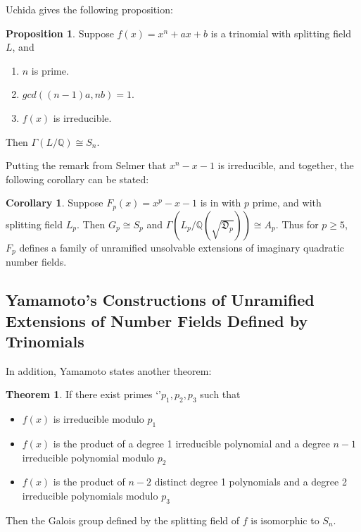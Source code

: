 \documentclass[12pt]{extarticle}
\newcommand{\Q}{\mathbb{Q}}
\newcommand{\<}{\langle}
\renewcommand{\>}{\rangle}
\theoremstyle{definition}
\newtheorem{theorem}{Theorem}
\newtheorem{corollary}{Corollary}
\newtheorem{proposition}{Proposition}
\begin{document}
Uchida \cite{uchida1970} gives the following proposition:
\begin{proposition}
Suppose $f(x)=x^n+ax+b$ is a trinomial with splitting field $L$, and 
\begin{enumerate}
\item $n$ is prime.
\item $gcd((n-1)a,nb)=1$.
\item $f(x)$ is irreducible.
\end{enumerate}
Then $\Gamma(L/\Q) \cong S_n$. \label{prop:uchida}
\end{proposition}
Putting the remark from Selmer \cite{SELMER} that $x^n-x-1$ is irreducible,  and  together, the following corollary can be stated:
\begin{corollary}
Suppose $F_p(x)=x^p-x-1$ is in  with $p$ prime, and with splitting field $L_p$. Then $G_p \cong S_p$ and $\Gamma\left(L_p/\Q\left(\sqrt{\mathfrak{D}_p}\right)\right)\cong A_p$. Thus for $p \geq 5$, $F_p$ defines a family of unramified unsolvable extensions of imaginary quadratic number fields. 
\end{corollary}
\subsection{Yamamoto's Constructions of Unramified Extensions of Number Fields Defined by Trinomials}
In addition, Yamamoto states another theorem:
\begin{theorem}
If there exist primes `'$p_1, p_2, p_3$ such that \begin{itemize}
\item $f(x)$ is irreducible modulo $p_1$
\item $f(x)$ is the product of a degree 1 irreducible polynomial and a degree $n-1$ irreducible polynomial modulo $p_2$
\item $f(x)$ is the product of $n-2$ distinct degree 1 polynomials and a degree 2 irreducible polynomials modulo $p_3$
\end{itemize}
Then the Galois group defined by the splitting field of $f$ is isomorphic to $S_n$.

\end{theorem}
\end{document}
